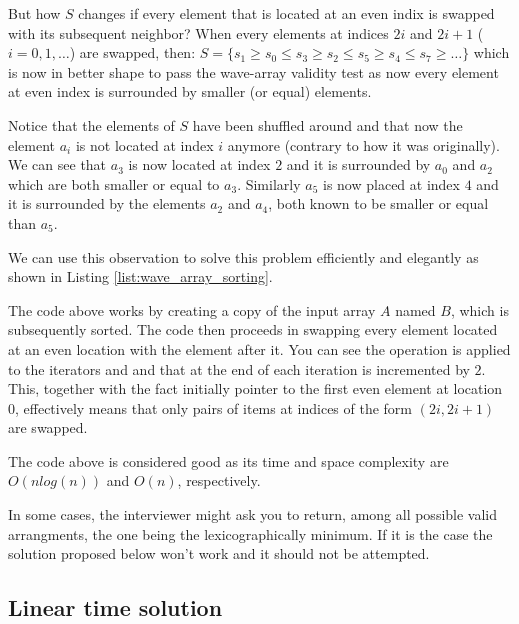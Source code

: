 But how $S$ changes if every
element that is located at an even indix is swapped with its subsequent neighbor? When every elements at indices $2i$ and $2i+1$ ($i=0,1,\ldots$) are swapped, then:
$S=\{s_1
\geq s_0 \leq s_3 \geq s_2 \leq s_5 \geq s_4 \leq s_7  \geq \ldots\}$ which is now in better shape to pass the wave-array validity test as now every element at even index is surrounded by smaller (or equal) elements. 

Notice that the elements of $S$ have been shuffled around and that now the element $a_i$ is not located at index $i$ anymore (contrary to how it was originally).
We can see that $a_3$ is now located at index $2$ and it is surrounded by $a_0$ and $a_2$ which are both smaller or equal to $a_3$.
Similarly $a_5$ is now placed at index $4$ and it is surrounded by the elements $a_2$ and $a_4$, both known to be smaller or equal than $a_5$.

We can
use this observation to solve this problem efficiently and elegantly as shown in  Listing \ref{list:wave_array_sorting}.



The code above works by creating a copy of the input array $A$ named $B$, which is subsequently sorted. The code then proceeds in swapping every element located at an even location with the element after it. You can see the  operation is applied to the iterators  and  and that at the end of each iteration  is incremented by $2$. This, together with the fact  initially pointer to the first even element  at location $0$, effectively means that only pairs of items at indices of the form $(2i, 2i+1)$ are swapped.

The code above is considered good  as its time and space complexity are $O(nlog(n))$
and $O(n)$, respectively.

In some cases, the interviewer might ask you to return, among all possible valid arrangments, the one being the lexicographically minimum. If it is the case the solution proposed below won't
work and it should not be attempted.


\subsection{Linear time solution}

